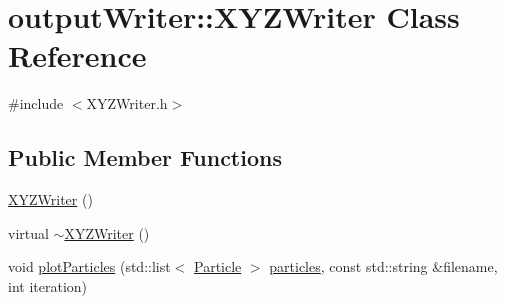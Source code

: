 \hypertarget{classoutputWriter_1_1XYZWriter}{\section{output\-Writer\-:\-:X\-Y\-Z\-Writer Class Reference}
\label{classoutputWriter_1_1XYZWriter}
}


{\ttfamily \#include $<$X\-Y\-Z\-Writer.\-h$>$}

\subsection*{Public Member Functions}
\begin{DoxyCompactItemize}
\item 
\hyperlink{classoutputWriter_1_1XYZWriter_a73b1eacd622152993f2fa6c181e69c8a}{X\-Y\-Z\-Writer} ()
\item 
virtual \hyperlink{classoutputWriter_1_1XYZWriter_ad3fe6dbb5e1aa5bdeffcc9986795309b}{$\sim$\-X\-Y\-Z\-Writer} ()
\item 
void \hyperlink{classoutputWriter_1_1XYZWriter_abb2b3a4ca72c047f8ca25cc3fadffc6b}{plot\-Particles} (std\-::list$<$ \hyperlink{classParticle}{Particle} $>$ \hyperlink{InputParticles_8h_acc42f43077e01f03478dad72f0e59107}{particles}, const std\-::string \&filename, int iteration)
\end{DoxyCompactItemize}


